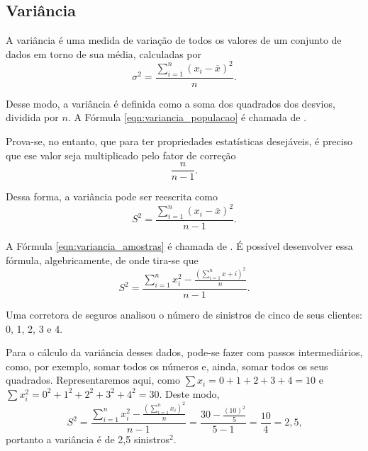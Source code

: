 \documentclass[11pt,fleqn]{book}
\numberwithin{mpicture}{chapter}
\numberwithin{mtable}{chapter}
\numberwithin{mframe}{chapter}
\begin{document}
\subsection{Variância}

A variância é uma medida de variação de todos os valores de um conjunto de dados em torno de sua média, calculadas por
\begin{equation}
	\label{eqn:variancia_populacao}
	\sigma ^2 = \frac{
		\displaystyle \sum_{i=1}^{n} (x_i - \overline{x})^2
	} {
		n
	} \text{.}
\end{equation}

Desse modo, a variância é definida como a soma dos quadrados dos desvios, dividida por $n$. A Fórmula \ref{eqn:variancia_populacao} é chamada de .

Prova-se, no entanto, que para ter propriedades estatísticas desejáveis, é preciso que ese valor seja multiplicado pelo fator de correção
\[
	\frac{n}{n-1}
	\text{.}
\]

Dessa forma, a variância pode ser reescrita como
\begin{equation}
	\label{eqn:variancia_amostras}
	S^2=\frac{
		\displaystyle \sum_{i=1}^{n} (x_i - \overline{x})^2
	} {
		n-1
	}\text{.}
\end{equation}

A Fórmula \ref{eqn:variancia_amostras} é chamada de . É possível desenvolver essa fórmula, algebricamente, de onde tira-se que
\[
	S^2=\frac{
		\displaystyle \sum_{i=1}^{n} x_i^2
		-
		\displaystyle \frac{
			\left (
				\displaystyle \sum_{i=1}^{n} x+i
			\right ) ^2
		}{n}
	} {
		n-1
	}
	\text{.}
\]

\begin{example}
	\label{example:sinistros_var}
	Uma corretora de seguros analisou o número de sinistros de cinco de seus clientes: 0, 1, 2, 3 e 4. 
	
	Para o cálculo da variância desses dados, pode-se fazer com passos intermediários, como, por exemplo, somar todos os números e, ainda, somar todos os seus quadrados. Representaremos aqui, como $\sum x_i=0+1+2+3+4=10$ e $\sum x_i^2= 0^2+1^2+2^2+3^2+4^2=30$. Deste modo,
	\[
		S^2=\frac{
			\displaystyle\sum_{i=1}^{n} x_i^2
			-
			\displaystyle\frac{
				\left (
					\displaystyle \sum_{i=1}^{n} x_i
				\right )^2
			}{n}
		}{n-1}
		=\frac{30-\displaystyle\frac{(10)^2}{5}}{5-1}
		=\frac{10}{4}
		=2,5\text{,}
	\]
	portanto a variância é de 2,5 sinistros$^2$.
\end{example}
\end{document}
